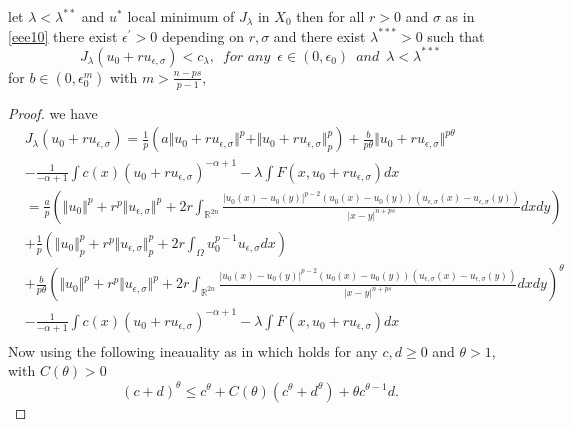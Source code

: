 \documentclass[10pt,twoside,reqno,centertags,draft]{amsart}
\begin{document}
\begin{lemma}\label{l10}
let $ \lambda <\lambda^{**}$ and $ u^*$ local minimum of $ J_{\lambda}$ in $ X_0$ then for all $ r >0$ and $ \sigma$ as in \ref{eee10} there exist $\epsilon^{\prime} >0$ depending on $ r, \sigma$ and there exist $ \lambda^{***} >0$ such that
\begin{equation*}
J_{\lambda}(u_0 +ru_{\epsilon,\sigma}) <c_{\lambda},\,\,\, \textit{for any} \,\,\, \epsilon \in (0, \epsilon_{0})\,\,\, \textit{and}\,\,\, \lambda < \lambda^{***}
\end{equation*} 
for $ b \in (0 ,\epsilon_{0}^{m})$ with $ m > \frac{n-ps}{p -1},$
\end{lemma}
\begin{proof}
we have
{\footnotesize
\begin{equation*}
\begin{aligned}
&J_{\lambda}(u_0 +ru_{\epsilon,\sigma})=\frac{1}{p} \left(a \Vert u_0 +ru_{\epsilon,\sigma}\Vert^p + \Vert u_0 +ru_{\epsilon,\sigma} \Vert^{p}_{p}\right) + \frac{b}{p \theta}\Vert u_0 +ru_{\epsilon,\sigma} \Vert^{p \theta} \\
& -\frac{1}{-\alpha+1} \int c(x)(u_0 +ru_{\epsilon,\sigma})^{-\alpha+1} - \lambda\int F(x,u_0 +ru_{\epsilon,\sigma})dx\\
& =\frac{a}{p} \left(\Vert u_0\Vert^{p} +r^{p}\Vert u_{\epsilon,\sigma}\Vert^{p} +2r\int_{\mathbb{R}^{2n}}\frac{\vert u_0(x) -u_0(y)\vert^{p -2}(u_0(x) -u_0(y))(u_{\epsilon,\sigma}(x) -u_{\epsilon,\sigma}(y))}{\vert x -y\vert^{n +ps}}dxdy \right)\\
& +\frac{1}{p}\left( \Vert u_0\Vert^{p}_{p} +r^{p}\Vert u_{\epsilon,\sigma}\Vert^{p}_{p} +2r\int_{\Omega}u_0^{p-1}u_{\epsilon,\sigma}dx\right)\\
& +\frac{b}{p\theta}\left( \Vert u_0\Vert^{p} +r^{p}\Vert u_{\epsilon,\sigma}\Vert^{p} +2r\int_{\mathbb{R}^{2n}}\frac{\vert u_0(x) -u_0(y)\vert^{p -2}(u_0(x) -u_0(y))(u_{\epsilon,\sigma}(x) -u_{\epsilon,\sigma}(y))}{\vert x -y\vert^{n +ps}}dxdy \right)^{\theta}\\
& -\frac{1}{-\alpha+1} \int c(x)(u_0 +ru_{\epsilon,\sigma})^{-\alpha+1} - \lambda\int F(x,u_0 +ru_{\epsilon,\sigma})dx\\
\end{aligned}
\end{equation*}
}
Now using the  following ineauality as in \cite{fiscella2019nehari} which holds for any $ c, d\geq 0$ and $ \theta >1,$ with $ C(\theta) >0$ 
\begin{equation*}
\left( c +d\right)^{\theta} \leq c^{\theta} +C(\theta)\left( c^{\theta} +d^{\theta}\right) +\theta c^{\theta -1}d.

\end{equation*}
\end{proof}
\end{document}
